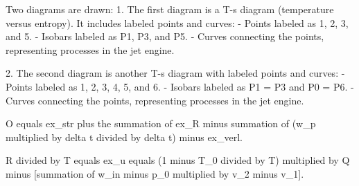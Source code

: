 Two diagrams are drawn:  
1. The first diagram is a T-s diagram (temperature versus entropy). It includes labeled points and curves:  
   - Points labeled as 1, 2, 3, and 5.  
   - Isobars labeled as P1, P3, and P5.  
   - Curves connecting the points, representing processes in the jet engine.  

2. The second diagram is another T-s diagram with labeled points and curves:  
   - Points labeled as 1, 2, 3, 4, 5, and 6.  
   - Isobars labeled as P1 = P3 and P0 = P6.  
   - Curves connecting the points, representing processes in the jet engine.

O equals ex_str plus the summation of ex_R minus summation of (w_p multiplied by delta t divided by delta t) minus ex_verl.  

R divided by T equals ex_u equals (1 minus T_0 divided by T) multiplied by Q minus [summation of w_in minus p_0 multiplied by v_2 minus v_1].